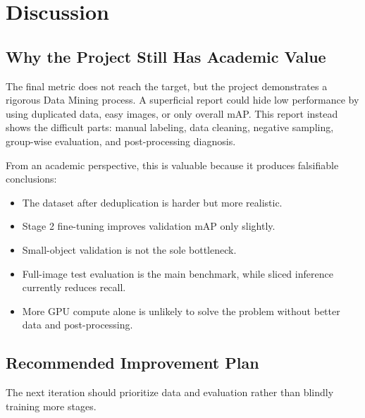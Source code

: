 \documentclass[12pt,a4paper]{report}
\begin{document}
\chapter{Discussion}
\section{Why the Project Still Has Academic Value}
The final metric does not reach the target, but the project demonstrates a rigorous Data Mining process. A superficial report could hide low performance by using duplicated data, easy images, or only overall mAP. This report instead shows the difficult parts: manual labeling, data cleaning, negative sampling, group-wise evaluation, and post-processing diagnosis.

From an academic perspective, this is valuable because it produces falsifiable conclusions:

\begin{itemize}
    \item The dataset after deduplication is harder but more realistic.
    \item Stage 2 fine-tuning improves validation mAP only slightly.
    \item Small-object validation is not the sole bottleneck.
    \item Full-image test evaluation is the main benchmark, while sliced inference currently reduces recall.
    \item More GPU compute alone is unlikely to solve the problem without better data and post-processing.
\end{itemize}

\section{Recommended Improvement Plan}
The next iteration should prioritize data and evaluation rather than blindly training more stages.
\end{document}
